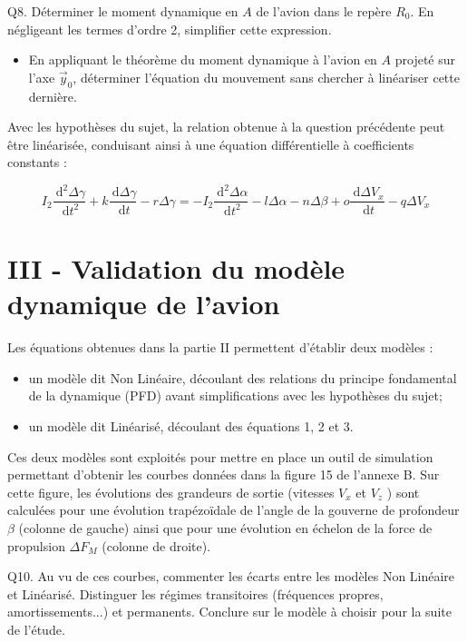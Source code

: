 \documentclass[10pt]{article}
\begin{document}
Q8. Déterminer le moment dynamique en $A$ de l'avion dans le repère $R_{0}$. En négligeant les termes d'ordre 2, simplifier cette expression.

\begin{itemize}
  \item[Q9.] En appliquant le théorème du moment dynamique à l'avion en $A$ projeté sur l'axe $\vec{y}_{0}$, déterminer l'équation du mouvement sans chercher à linéariser cette dernière.
\end{itemize}

Avec les hypothèses du sujet, la relation obtenue à la question précédente peut être linéarisée, conduisant ainsi à une équation différentielle à coefficients constants :


\begin{equation*}
I_{2} \frac{\mathrm{~d}^{2} \Delta \gamma}{\mathrm{~d} t^{2}}+k \frac{\mathrm{~d} \Delta \gamma}{\mathrm{~d} t}-r \Delta \gamma=-I_{2} \frac{\mathrm{~d}^{2} \Delta \alpha}{\mathrm{~d} t^{2}}-l \Delta \alpha-n \Delta \beta+o \frac{\mathrm{~d} \Delta V_{x}}{\mathrm{~d} t}-q \Delta V_{x} \tag{3}
\end{equation*}


\section*{III - Validation du modèle dynamique de l'avion}
Les équations obtenues dans la partie II permettent d'établir deux modèles :

\begin{itemize}
  \item[-] un modèle dit Non Linéaire, découlant des relations du principe fondamental de la dynamique (PFD) avant simplifications avec les hypothèses du sujet;
  \item[-] un modèle dit Linéarisé, découlant des équations 1, 2 et 3.
\end{itemize}

Ces deux modèles sont exploités pour mettre en place un outil de simulation permettant d'obtenir les courbes données dans la figure 15 de l'annexe B. Sur cette figure, les évolutions des grandeurs de sortie (vitesses $V_{x}$ et $V_{z}$ ) sont calculées pour une évolution trapézoïdale de l'angle de la gouverne de profondeur $\beta$ (colonne de gauche) ainsi que pour une évolution en échelon de la force de propulsion $\Delta F_{M}$ (colonne de droite).

Q10. Au vu de ces courbes, commenter les écarts entre les modèles Non Linéaire et Linéarisé. Distinguer les régimes transitoires (fréquences propres, amortissements...) et permanents. Conclure sur le modèle à choisir pour la suite de l'étude.
\end{document}
